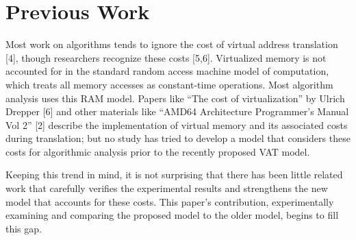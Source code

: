 \section{Previous Work}

Most work on algorithms tends to ignore the cost of virtual address translation
[4], though researchers recognize these costs [5,6]. Virtualized memory is
not accounted for in the standard random access machine model of computation,
which treats all memory accesses as constant-time operations. Most algorithm
analysis uses this RAM model. Papers like “The cost of virtualization” by
Ulrich Drepper [6] and other materials like “AMD64 Architecture Programmer’s
Manual Vol 2” [2] describe the implementation of virtual memory and its
associated costs during translation; but no study has tried to develop a model
that considers these costs for algorithmic analysis prior to the recently
proposed VAT model.

Keeping this trend in mind, it is not surprising that there has been little
related work that carefully verifies the experimental results and strengthens
the new model that accounts for these costs. This paper's contribution,
experimentally examining and comparing the proposed model to the older model,
begins to fill this gap. 
